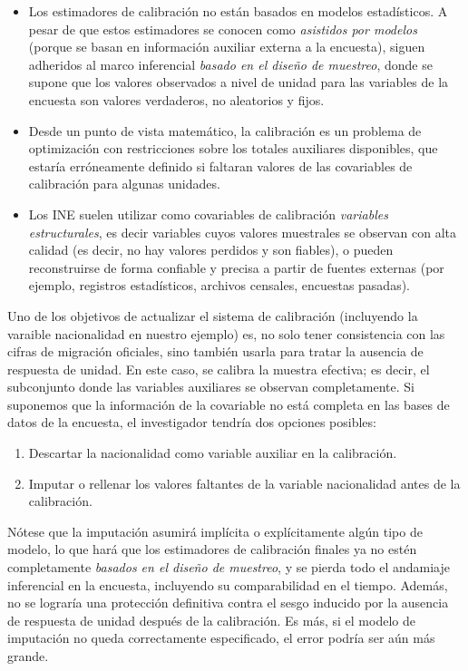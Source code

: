 \documentclass[
  12pt,
  spanish,
]{book}
\providecommand{\tightlist}{%
  \setlength{\itemsep}{0pt}\setlength{\parskip}{0pt}}
\begin{document}
\begin{itemize}
\item
  Los estimadores de calibración no están basados en modelos estadísticos. A pesar de que estos estimadores se conocen como \emph{asistidos por modelos} (porque se basan en información auxiliar externa a la encuesta), siguen adheridos al marco inferencial \emph{basado en el diseño de muestreo}, donde se supone que los valores observados a nivel de unidad para las variables de la encuesta son valores verdaderos, no aleatorios y fijos.
\item
  Desde un punto de vista matemático, la calibración es un problema de optimización con restricciones sobre los totales auxiliares disponibles, que estaría erróneamente definido si faltaran valores de las covariables de calibración para algunas unidades.
\item
  Los INE suelen utilizar como covariables de calibración \emph{variables estructurales}, es decir variables cuyos valores muestrales se observan con alta calidad (es decir, no hay valores perdidos y son fiables), o pueden reconstruirse de forma confiable y precisa a partir de fuentes externas (por ejemplo, registros estadísticos, archivos censales, encuestas pasadas).
\end{itemize}

Uno de los objetivos de actualizar el sistema de calibración (incluyendo la varaible nacionalidad en nuestro ejemplo) es, no solo tener consistencia con las cifras de migración oficiales, sino también usarla para tratar la ausencia de respuesta de unidad. En este caso, se calibra la muestra efectiva; es decir, el subconjunto donde las variables auxiliares se observan completamente. Si suponemos que la información de la covariable no está completa en las bases de datos de la encuesta, el investigador tendría dos opciones posibles:

\begin{enumerate}
\def\labelenumi{\arabic{enumi}.}
\tightlist
\item
  Descartar la nacionalidad como variable auxiliar en la calibración.
\item
  Imputar o rellenar los valores faltantes de la variable nacionalidad antes de la calibración.
\end{enumerate}

Nótese que la imputación asumirá implícita o explícitamente algún tipo de modelo, lo que hará que los estimadores de calibración finales ya no estén completamente \emph{basados en el diseño de muestreo}, y se pierda todo el andamiaje inferencial en la encuesta, incluyendo su comparabilidad en el tiempo. Además, no se lograría una protección definitiva contra el sesgo inducido por la ausencia de respuesta de unidad después de la calibración. Es más, si el modelo de imputación no queda correctamente especificado, el error podría ser aún más grande.
\end{document}
